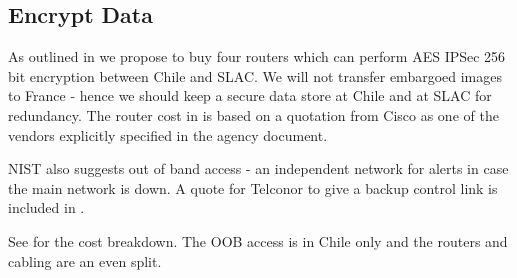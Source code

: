 \subsection{Encrypt Data} \label{sec:1encrypt}

As outlined in   we propose to buy four routers which can perform AES IPSec 256 bit encryption between Chile and SLAC.
We will not transfer embargoed images to France - hence we should keep a secure data store at Chile and at SLAC for redundancy.
The router cost in   is based on a quotation from Cisco as one of the vendors explicitly specified in the agency document.

NIST also suggests out of band access - an independent network for alerts in case the main network is down.
A quote for Telconor to give a backup control link is included in .

See  for the cost breakdown.  The OOB access is in Chile only and the routers and cabling are an even split.



